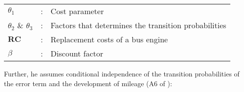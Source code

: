 \documentclass[a4paper,12pt,bold]{scrartcl}
\begin{document}
\begin{table}[htbp]
    \centering %
    \begin{tabular}{l c p{10cm} }
        $\theta_1$ & : & Cost parameter\\
        $\theta_2$ \& $\theta_3$ & : & Factors that determines the transition probabilities\\
        $\mathbf{RC}$ & : & Replacement costs of a bus engine\\
        $\beta$ & : & Discount factor\\
    \end{tabular}
\end{table}

Further, he assumes conditional independence of the transition probabilities of the error term and the development of mileage (A6 of \cite{Rust.1988}):
\end{document}
